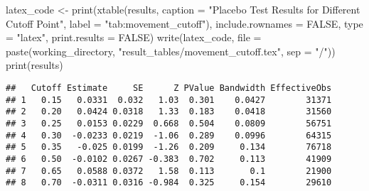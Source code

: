 \documentclass[
]{article}
\newenvironment{Shaded}{\begin{snugshade}}{\end{snugshade}}
\newcommand{\AttributeTok}[1]{\textcolor[rgb]{0.77,0.63,0.00}{#1}}
\newcommand{\ConstantTok}[1]{\textcolor[rgb]{0.00,0.00,0.00}{#1}}
\newcommand{\FunctionTok}[1]{\textcolor[rgb]{0.00,0.00,0.00}{#1}}
\newcommand{\NormalTok}[1]{#1}
\newcommand{\OtherTok}[1]{\textcolor[rgb]{0.56,0.35,0.01}{#1}}
\newcommand{\StringTok}[1]{\textcolor[rgb]{0.31,0.60,0.02}{#1}}
\begin{document}
\begin{Shaded}
\begin{Highlighting}[]
\NormalTok{latex\_code }\OtherTok{\textless{}{-}} \FunctionTok{print}\NormalTok{(}\FunctionTok{xtable}\NormalTok{(results, }\AttributeTok{caption =} \StringTok{"Placebo Test Results for Different Cutoff Point"}\NormalTok{,}
    \AttributeTok{label =} \StringTok{"tab:movement\_cutoff"}\NormalTok{), }\AttributeTok{include.rownames =} \ConstantTok{FALSE}\NormalTok{, }\AttributeTok{type =} \StringTok{"latex"}\NormalTok{, }\AttributeTok{print.results =} \ConstantTok{FALSE}\NormalTok{)}
\FunctionTok{write}\NormalTok{(latex\_code, }\AttributeTok{file =} \FunctionTok{paste}\NormalTok{(working\_directory, }\StringTok{"result\_tables/movement\_cutoff.tex"}\NormalTok{,}
    \AttributeTok{sep =} \StringTok{"/"}\NormalTok{))}
\FunctionTok{print}\NormalTok{(results)}
\end{Highlighting}
\end{Shaded}

\begin{verbatim}
##   Cutoff Estimate     SE      Z PValue Bandwidth EffectiveObs
## 1   0.15   0.0331  0.032   1.03  0.301    0.0427        31371
## 2   0.20   0.0424 0.0318   1.33  0.183    0.0418        31560
## 3   0.25   0.0153 0.0229  0.668  0.504    0.0809        56751
## 4   0.30  -0.0233 0.0219  -1.06  0.289    0.0996        64315
## 5   0.35   -0.025 0.0199  -1.26  0.209     0.134        76718
## 6   0.50  -0.0102 0.0267 -0.383  0.702     0.113        41909
## 7   0.65   0.0588 0.0372   1.58  0.113       0.1        21900
## 8   0.70  -0.0311 0.0316 -0.984  0.325     0.154        29610
\end{verbatim}
\end{document}

